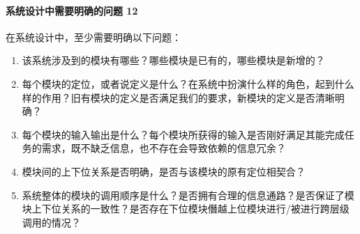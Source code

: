 \documentclass[letterpaper,11pt,english]{sphinxmanual}
\begin{document}
\paragraph{系统设计中需要明确的问题 12\sphinxfootnotemark[370]}
\label{\detokenize{chapter_idea/understand_tech:id11}}%
\begin{footnotetext}[370]\sphinxAtStartFootnote
{}
%
\end{footnotetext}\ignorespaces 
在系统设计中，至少需要明确以下问题：
\begin{enumerate}
%
\item {} 
该系统涉及到的模块有哪些？哪些模块是已有的，哪些模块是新增的？

\item {} 
每个模块的定位，或者说定义是什么？在系统中扮演什么样的角色，起到什么样的作用？旧有模块的定义是否满足我们的要求，新模块的定义是否清晰明确？

\item {} 
每个模块的输入输出是什么？每个模块所获得的输入是否刚好满足其能完成任务的需求，既不缺乏信息，也不存在会导致依赖的信息冗余？

\item {} 
模块间的上下位关系是否明确，是否与该模块的原有定位相契合？

\item {} 
系统整体的模块的调用顺序是什么？是否拥有合理的信息通路？是否保证了模块上下位关系的一致性？是否存在下位模块僭越上位模块进行/被进行跨层级调用的情况？

\end{enumerate}
\end{document}
